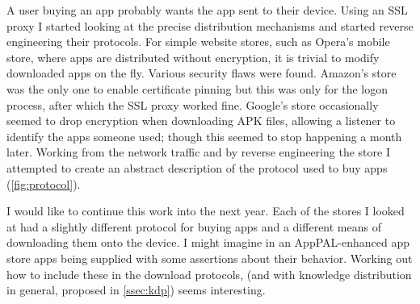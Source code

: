 \documentclass[a4paper]{scrartcl}
\begin{document}
A user buying an app probably wants the app sent to their device.
Using an SSL proxy I started looking at the precise distribution mechanisms and started reverse engineering their protocols.
For simple website stores, such as Opera's mobile store, where apps are distributed without encryption, it is trivial to modify downloaded apps on the fly.
Various security flaws were found.
Amazon's store was the only one to enable certificate pinning but this was only for the logon process, after which the SSL proxy worked fine.
Google's store occasionally seemed to drop encryption when downloading APK files, allowing a listener to identify the apps someone used; though this seemed to stop happening a month later.
Working from the network traffic and by reverse engineering the store I attempted to create an abstract description of the protocol used to buy apps (\autoref{fig:protocol}).

I would like to continue this work into the next year.
Each of the stores I looked at had a slightly different protocol for buying apps and a different means of downloading them onto the device.
I might imagine in an AppPAL-enhanced app store apps being supplied with some assertions about their behavior.
Working out how to include these in the download protocols, (and with knowledge distribution in general, proposed in \autoref{ssec:kdp}) seems interesting.
\end{document}
